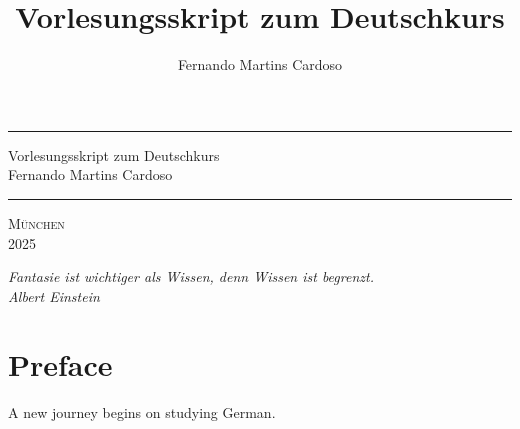 \documentclass[12pt,a4paper,twoside]{book}
\title{Vorlesungsskript zum Deutschkurs}
\author{Fernando Martins Cardoso}
\begin{document}
\thispagestyle{empty}
\newcommand{\HRule}{\rule{\linewidth}{1mm}}
\setlength{\parindent}{0mm}
\setlength{\parskip}{0mm}
 \HRule
 \begin{flushright}
  \Huge Vorlesungsskript zum Deutschkurs\\[5mm]
        \huge Fernando Martins Cardoso
 \end{flushright}
 \HRule
 \begin{center}
  \Large\textsc{München\\ 2025}
 \end{center}
 
\newpage
\topmargin 7.2in
\thispagestyle{empty}
\begin{flushright}
\textit{Fantasie ist wichtiger als Wissen, denn Wissen ist begrenzt.\\Albert Einstein}
\end{flushright}

\newpage
\hoffset -1in           %
\voffset -1in           %
\marginparwidth 0pt     %
\marginparsep 0pt       %
\parindent 12pt         %
\parskip 4pt            %
\topmargin 1cm          %
\headheight 15pt        %
\headsep 20pt           %
\oddsidemargin 2.5cm      %
\evensidemargin 2cm     %
\footskip 40pt

\chapter*{Preface}
A new journey begins on studying German.
\lipsum[1-10]

\tableofcontents

\newpage
{}

\pagestyle{fancy}                   %
\fancyhf{}                          %
\fancyfoot[LE]{\thepage}             %
\fancyfoot[RO]{\thepage}





\end{document}
